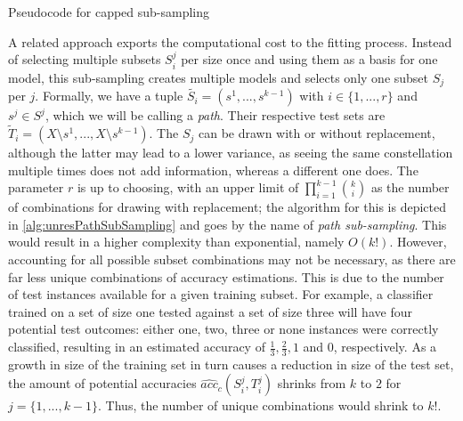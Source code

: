 \begin{algorithm}[h]
	\begin{algorithmic}[1]
		\State {}
		\State {}
		\EndFor
		\EndFor
	\end{algorithmic}
	\caption{Pseudocode for capped sub-sampling}
	\label{alg:cappedSubSampling}
\end{algorithm}

A related approach exports the computational cost to the fitting process. Instead of selecting multiple subsets $S^j_i$ per size once and using them as a basis for one model, this sub-sampling creates multiple models and selects only one subset $S_j$ per $j$. Formally, we have a tuple $\tilde{S_i} = (s^1,...,s^{k-1})$ with $i \in \{1,...,r\}$ and $s^j \in S^j$, which we will be calling a \textit{path}. Their respective test sets are $\tilde{T}_i = (X \setminus s^1,...,X \setminus s^{k-1})$. The $S_j$ can be drawn with or without replacement, although the latter may lead to a lower variance, as seeing the same constellation multiple times does not add information, whereas a different one does. The parameter $r$ is up to choosing, with an upper limit of $\prod_{i=1}^{k-1} {k \choose i}$ as the number of combinations for drawing with replacement; the algorithm for this is depicted in \ref{alg:unresPathSubSampling} and goes by the name of \textit{path sub-sampling}. This would result in a higher complexity than exponential, namely $O(k!)$. However, accounting for all possible subset combinations may not be necessary, as there are far less unique combinations of accuracy estimations. This is due to the number of test instances available for a given training subset. For example, a classifier trained on a set of size one tested against a set of size three will have four potential test outcomes: either one, two, three or none instances were correctly classified, resulting in an estimated accuracy of $\frac{1}{3}, \frac{2}{3}, 1$ and $0$, respectively. As a growth in size of the training set in turn causes a reduction in size of the test set, the amount of potential accuracies $\widehat{acc}_c(S^j_i, T^j_i)$ shrinks from $k$ to $2$ for $j = \{1, ..., k-1\}$. Thus, the number of unique combinations would shrink to $k!$.

